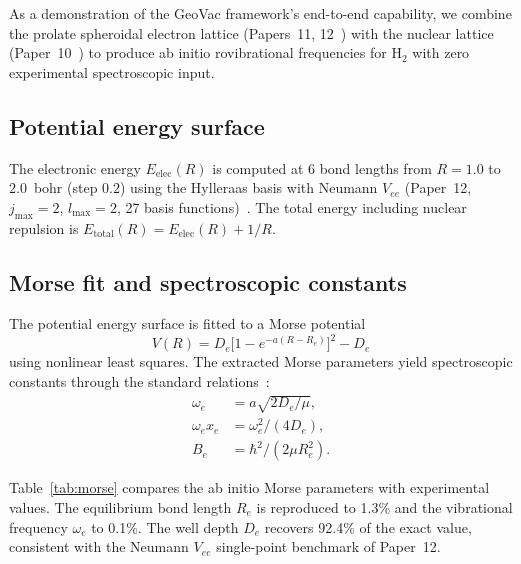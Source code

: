 \documentclass[aps,pra,twocolumn,superscriptaddress,longbibliography]{revtex4-2}
\begin{document}
As a demonstration of the GeoVac framework's end-to-end capability,
we combine the prolate spheroidal electron lattice (Papers~11,
12~\cite{loutey_paper11, loutey_paper12}) with the nuclear lattice
(Paper~10~\cite{loutey_paper10}) to produce ab initio rovibrational
frequencies for H$_2$ with zero experimental spectroscopic input.

\subsection{Potential energy surface}

The electronic energy $E_{\mathrm{elec}}(R)$ is computed at 6 bond
lengths from $R = 1.0$ to $2.0$~bohr (step $0.2$) using the Hylleraas basis
with Neumann $V_{ee}$ (Paper~12, $j_{\max}=2$, $l_{\max}=2$,
27 basis functions)~\cite{loutey_paper12}.
The total energy including nuclear repulsion is
$E_{\mathrm{total}}(R) = E_{\mathrm{elec}}(R) + 1/R$.

\subsection{Morse fit and spectroscopic constants}

The potential energy surface is fitted to a Morse potential
\begin{equation}
  V(R) = D_e\bigl[1 - e^{-a(R - R_e)}\bigr]^2 - D_e
  \label{eq:morse}
\end{equation}
using nonlinear least squares.  The extracted Morse parameters yield
spectroscopic constants through the standard
relations~\cite{Herzberg1950}:
\begin{align}
  \omega_e &= a\sqrt{2D_e/\mu}, \label{eq:omega_e} \\
  \omega_e x_e &= \omega_e^2/(4D_e), \label{eq:omega_exe} \\
  B_e &= \hbar^2/(2\mu R_e^2). \label{eq:Be}
\end{align}

Table~\ref{tab:morse} compares the ab initio Morse parameters with
experimental values.  The equilibrium bond length $R_e$ is
reproduced to 1.3\% and the vibrational frequency $\omega_e$ to
0.1\%.  The well depth $D_e$ recovers 92.4\% of the exact value,
consistent with the Neumann $V_{ee}$ single-point benchmark of
Paper~12.
\end{document}
